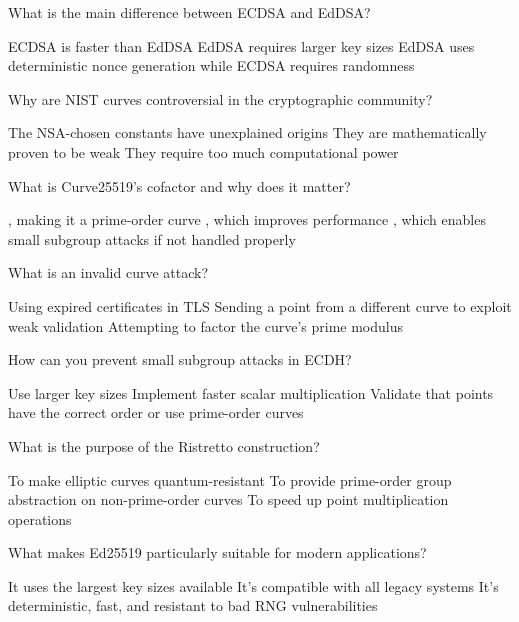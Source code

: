 \documentclass[10pt,a4paper,american]{exam}
\begin{document}
\begin{questions}
	\question What is the main difference between ECDSA and EdDSA?
	\begin{randomizechoices}
		\choice ECDSA is faster than EdDSA
		\choice EdDSA requires larger key sizes
		\CorrectChoice EdDSA uses deterministic nonce generation while ECDSA requires randomness
	\end{randomizechoices}

	\question Why are NIST curves controversial in the cryptographic community?
	\begin{randomizechoices}
		\CorrectChoice The NSA-chosen constants have unexplained origins
		\choice They are mathematically proven to be weak
		\choice They require too much computational power
	\end{randomizechoices}

	\question What is Curve25519's cofactor and why does it matter?
	\begin{randomizechoices}
		, making it a prime-order curve
		, which improves performance
		, which enables small subgroup attacks if not handled properly
	\end{randomizechoices}

	\question What is an invalid curve attack?
	\begin{randomizechoices}
		\choice Using expired certificates in TLS
		\CorrectChoice Sending a point from a different curve to exploit weak validation
		\choice Attempting to factor the curve's prime modulus
	\end{randomizechoices}

	\question How can you prevent small subgroup attacks in ECDH?
	\begin{randomizechoices}
		\choice Use larger key sizes
		\choice Implement faster scalar multiplication
		\CorrectChoice Validate that points have the correct order or use prime-order curves
	\end{randomizechoices}

	\question What is the purpose of the Ristretto construction?
	\begin{randomizechoices}
		\choice To make elliptic curves quantum-resistant
		\CorrectChoice To provide prime-order group abstraction on non-prime-order curves
		\choice To speed up point multiplication operations
	\end{randomizechoices}

	\question What makes Ed25519 particularly suitable for modern applications?
	\begin{randomizechoices}
		\choice It uses the largest key sizes available
		\choice It's compatible with all legacy systems
		\CorrectChoice It's deterministic, fast, and resistant to bad RNG vulnerabilities
	\end{randomizechoices}


\end{questions}
\end{document}
